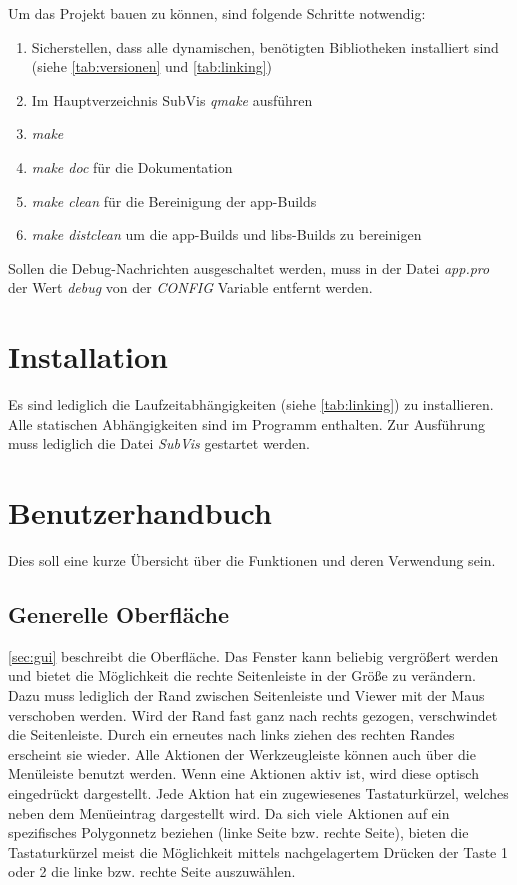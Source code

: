 Um das Projekt bauen zu können, sind folgende Schritte notwendig:

\begin{enumerate}
\item Sicherstellen, dass alle dynamischen, benötigten Bibliotheken installiert sind (siehe \autoref{tab:versionen} und \autoref{tab:linking})
\item Im Hauptverzeichnis SubVis \emph{qmake} ausführen
\item \emph{make}
\item \emph{make doc} für die Dokumentation
\item \emph{make clean} für die Bereinigung der app-Builds
\item \emph{make distclean} um die app-Builds und libs-Builds zu bereinigen
\end{enumerate}

Sollen die Debug-Nachrichten ausgeschaltet werden, muss in der Datei \emph{app.pro} der Wert \emph{debug} von der \emph{CONFIG} Variable entfernt werden.

\section{Installation}

Es sind lediglich die Laufzeitabhängigkeiten (siehe \autoref{tab:linking}) zu installieren. 
Alle statischen Abhängigkeiten sind im Programm enthalten.
Zur Ausführung muss lediglich die Datei \emph{SubVis} gestartet werden.

\section{Benutzerhandbuch}

Dies soll eine kurze Übersicht über die Funktionen und deren Verwendung sein.

\subsection{Generelle Oberfläche}

\autoref{sec:gui} beschreibt die Oberfläche. 
Das Fenster kann beliebig vergrößert werden und bietet die Möglichkeit die rechte Seitenleiste in der Größe zu verändern. 
Dazu muss lediglich der Rand zwischen Seitenleiste und Viewer mit der Maus verschoben werden.
Wird der Rand fast ganz nach rechts gezogen, verschwindet die Seitenleiste.
Durch ein erneutes nach links ziehen des rechten Randes erscheint sie wieder.
Alle Aktionen der Werkzeugleiste können auch über die Menüleiste benutzt werden.
Wenn eine Aktionen aktiv ist, wird diese optisch eingedrückt dargestellt.
Jede Aktion hat ein zugewiesenes Tastaturkürzel, welches neben dem Menüeintrag dargestellt wird.
Da sich viele Aktionen auf ein spezifisches Polygonnetz beziehen (linke Seite bzw. rechte Seite), bieten die Tastaturkürzel meist die Möglichkeit mittels nachgelagertem Drücken der Taste 1 oder 2 die linke bzw. rechte Seite auszuwählen.

